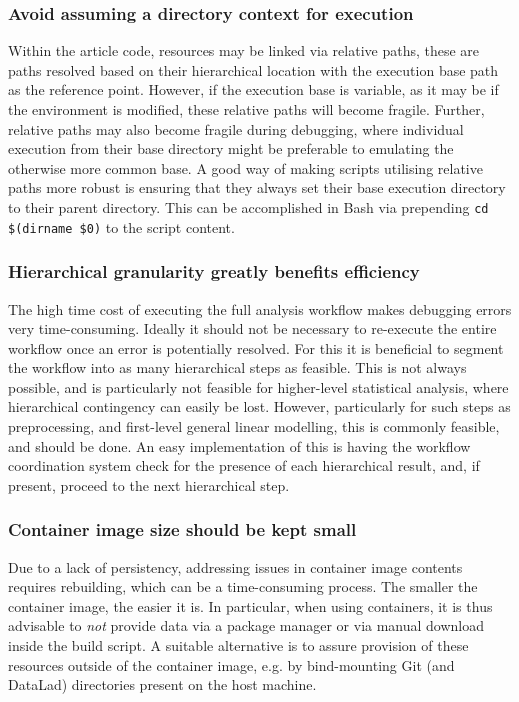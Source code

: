 \subsubsection{Avoid assuming a directory context for execution}
Within the article code, resources may be linked via relative paths, these are paths resolved based on their hierarchical location with the execution base path as the reference point.
However, if the execution base is variable, as it may be if the environment is modified, these relative paths will become fragile.
Further, relative paths may also become fragile during debugging, where individual execution from their base directory might be preferable to emulating the otherwise more common base.
A good way of making scripts utilising relative paths more robust is ensuring that they always set their base execution directory to their parent directory.
This can be accomplished in Bash via prepending \texttt{cd \textquotedbl\$(dirname \textquotedbl\$0\textquotedbl)\textquotedbl} to the script content.

\subsubsection{Hierarchical granularity greatly benefits efficiency}
The high time cost of executing the full analysis workflow makes debugging errors very time-consuming.
Ideally it should not be necessary to re-execute the entire workflow once an error is potentially resolved.
For this it is beneficial to segment the workflow into as many hierarchical steps as feasible.
This is not always possible, and is particularly not feasible for higher-level statistical analysis, where hierarchical contingency can easily be lost.
However, particularly for such steps as preprocessing, and first-level general linear modelling, this is commonly feasible, and should be done.
An easy implementation of this is having the workflow coordination system check for the presence of each hierarchical result, and, if present, proceed to the next hierarchical step.

\subsubsection{Container image size should be kept small}
Due to a lack of persistency, addressing issues in container image contents requires rebuilding, which can be a time-consuming process.
The smaller the container image, the easier it is.
In particular, when using containers, it is thus advisable to \textit{not} provide data via a package manager or via manual download inside the build script.
A suitable alternative is to assure provision of these resources outside of the container image, e.g. by bind-mounting Git (and DataLad) directories present on the host machine.

